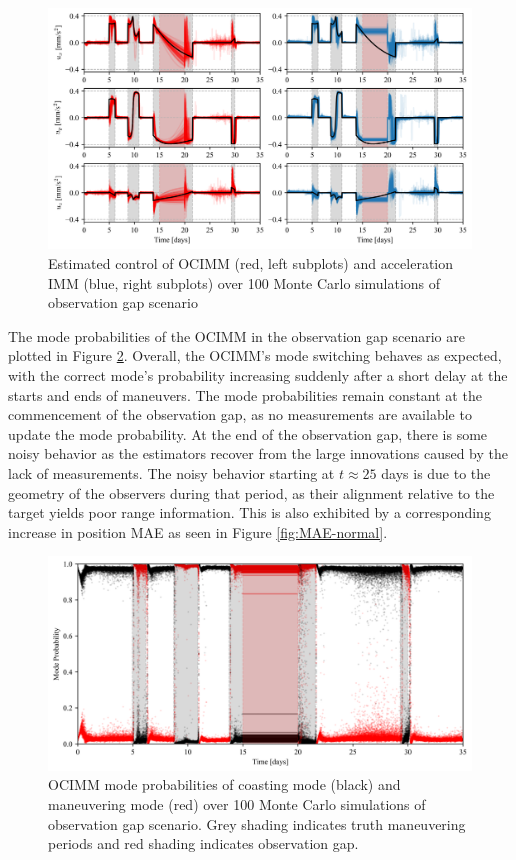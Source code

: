 \documentclass[letterpaper, preprint, paper,11pt]{AAS}	%
\begin{document}
\begin{figure}
    \centering
    \includegraphics[width=1\linewidth]{Figures/control.png}
    \caption{Estimated control of OCIMM (red, left subplots) and acceleration IMM (blue, right subplots) over 100 Monte Carlo simulations of observation gap scenario}
    \label{fig:control}
\end{figure}

The mode probabilities of the OCIMM in the observation gap scenario are plotted in Figure \ref{fig:mode-probabilities}. Overall, the OCIMM's mode switching behaves as expected, with the correct mode's probability increasing suddenly after a short delay at the starts and ends of maneuvers. The mode probabilities remain constant at the commencement of the observation gap, as no measurements are available to update the mode probability. At the end of the observation gap, there is some noisy behavior as the estimators recover from the large innovations caused by the lack of measurements. The noisy behavior starting at $t \approx 25$ days is due to the geometry of the observers during that period, as their alignment relative to the target yields poor range information. This is also exhibited by a corresponding increase in position MAE as seen in Figure \ref{fig:MAE-normal}.

\begin{figure}
    \centering
    \includegraphics[width=1\linewidth]{Figures/mode_probabilities.png}
    \caption{OCIMM mode probabilities of coasting mode (black) and maneuvering mode (red) over 100 Monte Carlo simulations of observation gap scenario. Grey shading indicates truth maneuvering periods and red shading indicates observation gap. }
    \label{fig:mode-probabilities}
\end{figure}
\end{document}

